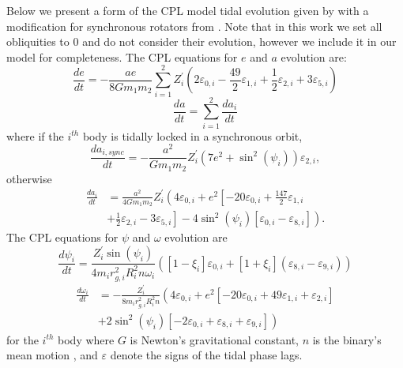 Below we present a form of the CPL model tidal evolution given by \citet{Heller2011} with a modification for synchronous rotators from \citet{FerrazMello2008}.  Note that in this work we set all obliquities to 0 and do not consider their evolution, however we include it in our model for completeness.  The CPL equations for $e$ and $a$ evolution are:
\begin{equation} \label{STEEP:eqn:cpl_dedt}
\frac{de}{dt} = -\frac{ae}{8 G m_1 m_2} \sum_{i=1}^2 Z_i^{'} \left( 2 \varepsilon_{0,i} - \frac{49}{2} \varepsilon_{1,i} + \frac{1}{2} \varepsilon_{2,i} + 3 \varepsilon_{5,i} \right)
\end{equation}
\begin{equation} \label{STEEP:eqn:cpl_dadt_net}
\frac{da}{dt} = \sum_{i=1}^2 \frac{da_i}{dt}
\end{equation}
where if the $i^{th}$ body is tidally locked in a synchronous orbit,
\begin{equation} \label{STEEP:eqn:cpl_dadt_locked}
\frac{da_{i,sync}}{dt} = -\frac{a^2}{G m_1 m_2} Z_i^{'} \left( 7 e^2 + \sin^2 (\psi_i) \right) \varepsilon_{2,i},
\end{equation}
otherwise
\begin{equation}
\begin{split}
\frac{da_i}{dt} & = \frac{a^2}{4 G m_1 m_2} Z_i^{'} \left( 4 \varepsilon_{0,i} + e^2 \left[ -20 \varepsilon_{0,i} + \frac{147}{2} \varepsilon_{1,i} \right. \right. \\
&  + \left. \left. \frac{1}{2} \varepsilon_{2,i} - 3 \varepsilon_{5,i} \right] - 4 \sin^2 (\psi_i) \left[ \varepsilon_{0,i} - \varepsilon_{8,i} \right] \right).
\end{split}
\end{equation}
The CPL equations for $\psi$ and $\omega$ evolution are
\begin{equation} \label{STEEP:eqn:cpl_dpsidt}
\frac{d\psi_i}{dt} = \frac{Z_i^{'} \sin(\psi_i)}{4 m_i r_{g,i}^2 R_i^2 n \omega_i} \left( [1-\xi_i] \varepsilon_{0,i} + [1+\xi_i](\varepsilon_{8,i} - \varepsilon_{9,i}) \right)
\end{equation}
\begin{equation} \label{STEEP:eqn:cpl_dwdt}
\begin{split}
\frac{d\omega_i}{dt}& = -\frac{Z_i^{'}}{8m_i r_{g,i}^2 R_i^2 n} \left(4 \varepsilon_{0,i} + e^2\left[-20\varepsilon_{0,i} + 49\varepsilon_{1,i} + \varepsilon_{2,i} \right] \right. \\
& \left. + 2 \sin^2(\psi_i) \left[ -2 \varepsilon_{0,i} + \varepsilon_{8,i} + \varepsilon_{9,i} \right] \right)
\end{split}
\end{equation}
for the $i^{th}$ body where $G$ is Newton's gravitational constant, $n$ is the binary's mean motion , and $\varepsilon$ denote the signs of the tidal phase lags.

